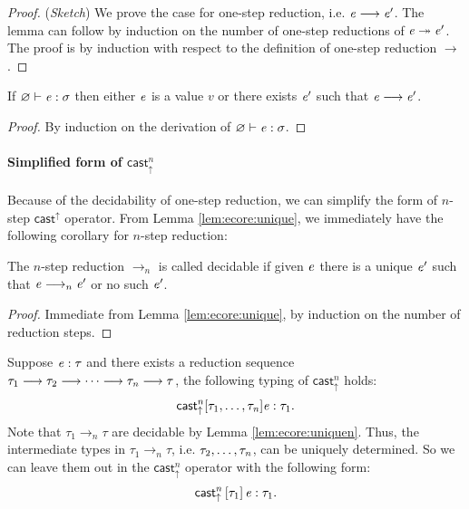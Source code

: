 \begin{proof}
    (\emph{Sketch}) We prove the case for one-step reduction, i.e. $\mathit{e}  \longrightarrow  \mathit{e'}$. The lemma can follow by induction on the number of one-step reductions
of $\mathit{e}  \twoheadrightarrow  \mathit{e'}$.
    The proof is by induction with respect to the definition of one-step
reduction $ \longrightarrow $.
\end{proof}

\begin{thm}[Progress]\label{lem:ecore:prog}
If $\varnothing  \vdash  \mathit{e}  :  \sigma$ then either $\mathit{e}$ is a value $v$ or there exists $\mathit{e}'$
such that $\mathit{e}  \longrightarrow  \mathit{e'}$.
\end{thm}

\begin{proof}
    By induction on the derivation of $\varnothing  \vdash  \mathit{e}  :  \sigma$.
\end{proof}

\paragraph{Simplified form of $ \mathsf{cast}_{\uparrow}^n $}
Because of the decidability of one-step reduction, we can simplify the form of 
$n$-step $ \mathsf{cast}^{\uparrow} $ operator. From Lemma \ref{lem:ecore:unique}, 
we immediately have the following corollary for $n$-step reduction:

\begin{lem}\label{lem:ecore:uniquen}
    The $n$-step reduction $ \longrightarrow_n $ is called decidable if 
    given $\mathit{e}$ there is a unique $\mathit{e'}$ such that $\mathit{e}  \longrightarrow_n  \mathit{e'}$ or no such $\mathit{e'}$.
\end{lem}

\begin{proof}
    Immediate from Lemma \ref{lem:ecore:unique}, by induction on the number of
reduction steps.
\end{proof}

Suppose $\mathit{e} : \tau$ and there exists a reduction sequence
$\tau_{{\mathrm{1}}}  \longrightarrow  \tau_{{\mathrm{2}}}  \longrightarrow  \dots  \longrightarrow  \tau_{\mathit{n}}  \longrightarrow  \tau$,
the following typing of $ \mathsf{cast}_{\uparrow}^n $ holds:
\[
     \mathsf{cast}_{\uparrow}^n  [ \tau_{{\mathrm{1}}}, \dots, \tau_{\mathit{n}} ] \mathit{e} : \tau_{{\mathrm{1}}}.
\]
Note that $\tau_{{\mathrm{1}}}  \longrightarrow_n  \tau$ are decidable by Lemma
\ref{lem:ecore:uniquen}. Thus, the intermediate types in $\tau_{{\mathrm{1}}}  \longrightarrow_n  \tau$,
i.e. $\tau_{{\mathrm{2}}}, \dots, \tau_{\mathit{n}}$, can be uniquely determined. So we can leave
them out in the $ \mathsf{cast}_{\uparrow}^n $ operator with the following form:
\[
    \mathsf{cast}_{\uparrow}^n \, [  \tau_{{\mathrm{1}}}  ] \,  \mathit{e} : \tau_{{\mathrm{1}}}.
\]
